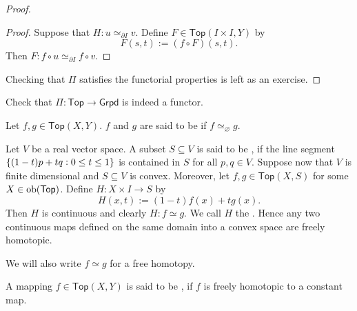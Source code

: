 \begin{proof}
\begin{enumerate}[label = \textit{Step \arabic*:},wide = 0pt, itemsep = 1.5ex]
\begin{itemize}[leftmargin = *]
					\begin{proof}
						Suppose that $H : u \simeq_{\partial I} v$. Define $F \in \mathsf{Top}(I \times I,Y)$ by
						\begin{equation*}
							F(s,t) := (f \circ F)(s,t).
						\end{equation*}
						Then $F : f \circ u \simeq_{\partial I} f \circ v$.
					\end{proof}
			\end{itemize}
	\end{enumerate}
	Checking that $\Pi$ satisfies the functorial properties is left as an exercise.
\end{proof}

\begin{exercise}
	Check that $\Pi : \mathsf{Top} \to \mathsf{Grpd}$ is indeed a functor.
\end{exercise}

\begin{definition}
	Let $f,g \in \mathsf{Top}(X,Y)$. $f$ and $g$ are said to be  if $f \simeq_{\varnothing} g$.
\end{definition}

\begin{example}
	Let $V$ be a real vector space. A subset $S \subseteq V$ is said to be , if the line segment $\cbr[0]{(1 - t)p + tq : 0 \leq t \leq 1}$ is contained in $S$ for all $p,q \in V$. Suppose now that $V$ is finite dimensional and $S \subseteq V$ is convex. Moreover, let $f,g \in \mathsf{Top}(X,S)$ for some $X \in \operatorname{ob}(\mathsf{Top})$. Define $H : X \times I \to S$ by
	\begin{equation*}
		H(x,t) := (1 - t)f(x) + tg(x).
	\end{equation*}
	Then $H$ is continuous and clearly $H : f \simeq g$. We call $H$ the . Hence any two continuous maps defined on the same domain into a convex space are freely homotopic.
\end{example}

\begin{remark}
	We will also write $f \simeq g$ for a free homotopy.
\end{remark}

\begin{definition}[Nullhomotopic]
	A mapping $f \in \mathsf{Top}(X,Y)$ is said to be , if $f$ is freely homotopic to a constant map.
\end{definition}

